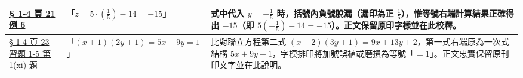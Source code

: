 \documentclass[a4paper,12pt,twoside]{article}
\begin{document}
\begin{table}[H]
\begin{tabularx}{\textwidth}{|p{3.0cm}|p{3.8cm}|X|}
\hyperref[note:b2-ch1-ex6-sign]{§ 1-4 頁 21 例 6} & 
「$z = 5\cdot (\frac{1}{5}) - 14 = -15$」 & 
式中代入 $y=-\frac{1}{5}$ 時，括號內負號脫漏（漏印為正 $\frac{1}{5}$），惟等號右端計算結果正確得出 $-15$（即 $5(-\frac{1}{5})-14 = -15$）。正文保留原印字樣並在此校釋。 \\ \hline

\hyperref[note:b2-ch1-ex1-5-q1-11]{§ 1-4 頁 23 習題 1-5 第 1(xi) 題} & 
「$(x+1)(2y+1) = 5x+9y=1$」 & 
比對聯立方程第二式 $(x+2)(3y+1) = 9x+13y+2$，第一式右端原為一次式結構 $5x+9y+1$，字模排印將加號誤植或磨損為等號「$=1$」。正文忠實保留原刊印文字並在此說明。 \\ \hline

\end{tabularx}
\end{table}

\clearpage
\tableofcontents
\newpage

\end{document}
